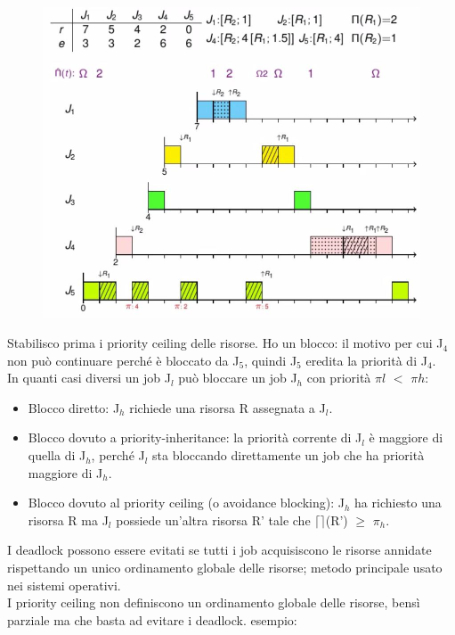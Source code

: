 \documentclass[12pt, oneside]{extbook}
\begin{document}
\begin{figure}[!h]
\centering
\includegraphics[scale=0.4]{immagini/image-024.jpg}
\end{figure}
Stabilisco prima i priority ceiling delle risorse. Ho un blocco: il motivo per cui J$_{4}$ non può continuare perché è bloccato da J$_{5}$, quindi J$_{5}$ eredita la priorità di J$_{4}$.\\ In quanti casi diversi un job J$_{l}$ può bloccare un job J$_{h}$ con priorità $\pi{l}$ $<$ $\pi{h}$:
\begin{itemize}
\item Blocco diretto: J$_{h}$ richiede una risorsa R assegnata a J$_{l}$.
\item Blocco dovuto a priority-inheritance: la priorità corrente di J$_{l}$ è maggiore di quella di J$_{h}$, perché J$_{l}$ sta bloccando direttamente un job che ha priorità maggiore di J$_{h}$.
\item Blocco dovuto al priority ceiling (o avoidance blocking): J$_{h}$ ha richiesto una risorsa R ma J$_{l}$ possiede un'altra risorsa R' tale che $\lceil\rceil$(R') $\geq$ $\pi_{h}$.
\end{itemize}
I deadlock possono essere evitati se tutti i job acquisiscono le risorse annidate rispettando un unico ordinamento globale delle risorse; metodo principale usato nei sistemi operativi.\\ I priority ceiling non definiscono un ordinamento globale delle risorse, bensì parziale ma che basta ad evitare i deadlock. esempio:\\
\end{document}
